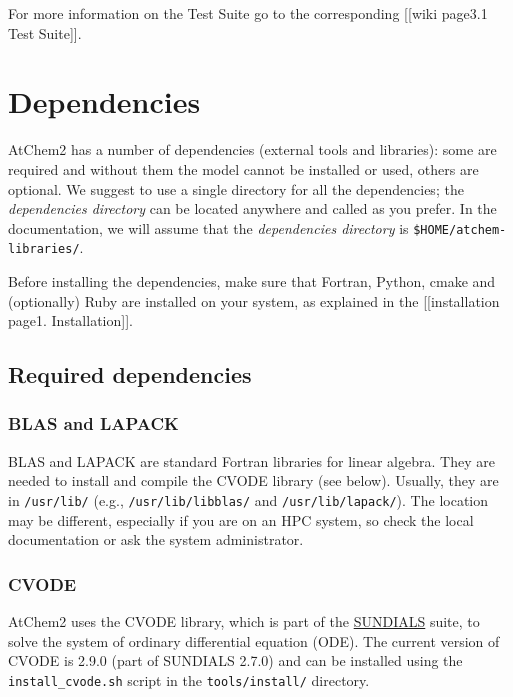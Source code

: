 For more information on the Test Suite go to the corresponding
{[}{[}wiki page\textbar{}3.1 Test Suite{]}{]}.

\section{Dependencies} \label{sec:dependencies}

AtChem2 has a number of dependencies (external tools and libraries):
some are required and without them the model cannot be installed or
used, others are optional. We suggest to use a single directory for
all the dependencies; the \emph{dependencies directory} can be located
anywhere and called as you prefer. In the documentation, we will
assume that the \emph{dependencies directory} is
\texttt{\$HOME/atchem-libraries/}.

Before installing the dependencies, make sure that Fortran, Python,
cmake and (optionally) Ruby are installed on your system, as explained
in the {[}{[}installation page\textbar{}1. Installation{]}{]}.

\subsection{Required
  dependencies} \label{subsec:required-dependencies}

\subsubsection{BLAS and LAPACK} \label{blas-and-lapack}

BLAS and LAPACK are standard Fortran libraries for linear
algebra. They are needed to install and compile the CVODE library (see
below).  Usually, they are in \texttt{/usr/lib/} (e.g.,
\texttt{/usr/lib/libblas/} and \texttt{/usr/lib/lapack/}). The
location may be different, especially if you are on an HPC system, so
check the local documentation or ask the system administrator.

\subsubsection{CVODE} \label{cvode}

AtChem2 uses the CVODE library, which is part of the
\href{https://computation.llnl.gov/projects/sundials}{SUNDIALS} suite,
to solve the system of ordinary differential equation (ODE). The
current version of CVODE is 2.9.0 (part of SUNDIALS 2.7.0) and can be
installed using the \texttt{install\_cvode.sh} script in the
\texttt{tools/install/} directory.

